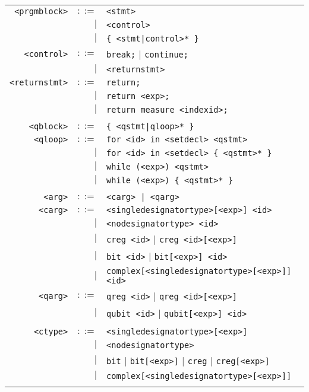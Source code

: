 \documentclass[notitlepage]{article}
\begin{document}
\begin{longtable}{rrl}
	\texttt{<prgmblock>} & $::=$ & \texttt{<stmt>} \\
	    & $\mid$ & \texttt{<control>} \\
	    & $\mid$ & \texttt{\{ <stmt|control>* \}} \\
	\texttt{<control>} & $::=$ & \texttt{break;} $\mid$ \texttt{continue;} \\
	    & $\mid$ & \texttt{<returnstmt>} \\
	\texttt{<returnstmt>} & $::=$ & \texttt{return;} \\
	    & $\mid$ & \texttt{return <exp>;} \\
	    & $\mid$ & \texttt{return measure <indexid>;} \\ \\
	\texttt{<qblock>} & $::=$ & \texttt{\{ <qstmt|qloop>* \}} \\
	\texttt{<qloop>} & $::=$ & \texttt{for <id> in <setdecl> <qstmt>} \\
	    & $\mid$ & \texttt{for <id> in <setdecl> \{ <qstmt>* \}} \\
	    & $\mid$ & \texttt{while (<exp>) <qstmt>} \\
	    & $\mid$ & \texttt{while (<exp>) \{ <qstmt>* \}} \\ \\
	\texttt{<arg>} & $::=$ & \texttt{<carg> | <qarg>} \\
	\texttt{<carg>} & $::=$ & \texttt{<singledesignatortype>[<exp>] <id>} \\
	    & $\mid$ & \texttt{<nodesignatortype> <id>} \\
	    & $\mid$ & \texttt{creg <id>} $\mid$ \texttt{creg <id>[<exp>]} \\
	    & $\mid$ & \texttt{bit <id>} $\mid$ \texttt{bit[<exp>] <id>} \\
	    & $\mid$ & \texttt{complex[<singledesignatortype>[<exp>]] <id>} \\
	\texttt{<qarg>} & $::=$ & \texttt{qreg <id>} $\mid$ \texttt{qreg <id>[<exp>]} \\
	    & $\mid$ & \texttt{qubit <id>} $\mid$ \texttt{qubit[<exp>] <id>} \\ \\
	\texttt{<ctype>} & $::=$ & \texttt{<singledesignatortype>[<exp>]} \\
	    & $\mid$ & \texttt{<nodesignatortype>} \\
	    & $\mid$ & \texttt{bit} $\mid$ \texttt{bit[<exp>]} $\mid$ \texttt{creg} $\mid$ \texttt{creg[<exp>]} \\
	    & $\mid$ & \texttt{complex[<singledesignatortype>[<exp>]]} \\ \\

\end{longtable}
\end{document}
